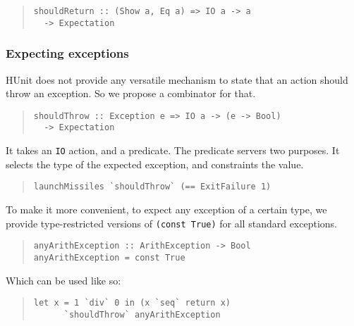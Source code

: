 \documentclass[preprint]{sigplanconf}
\begin{document}
\begin{quote}\small\begin{verbatim}
shouldReturn :: (Show a, Eq a) => IO a -> a
  -> Expectation
\end{verbatim}\end{quote}


\subsubsection{Expecting exceptions}

HUnit does not provide any versatile mechanism to state that an action
should throw an exception.  So we propose a combinator for that.

\begin{quote}\small\begin{verbatim}
shouldThrow :: Exception e => IO a -> (e -> Bool)
  -> Expectation
\end{verbatim}\end{quote}

\noindent It takes an {\tt IO} action, and a predicate.  The predicate
servers two purposes.  It selects the type of the expected exception,
and constraints the value.

\begin{quote}\small\begin{verbatim}
launchMissiles `shouldThrow` (== ExitFailure 1)
\end{verbatim}\end{quote}

\noindent To make it more convenient, to expect any exception of a
certain type, we provide type-restricted versions of {\tt (const
True)} for all standard exceptions.

\begin{quote}\small\begin{verbatim}
anyArithException :: ArithException -> Bool
anyArithException = const True
\end{verbatim}\end{quote}

\noindent Which can be used like so:

\begin{quote}\small\begin{verbatim}
let x = 1 `div` 0 in (x `seq` return x)
      `shouldThrow` anyArithException
\end{verbatim}\end{quote}
\end{document}
